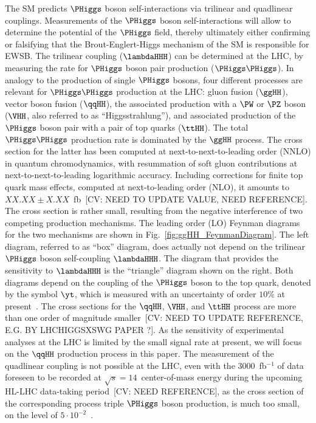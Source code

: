 The SM predicts $\PHiggs$ boson self-interactions via trilinear and quadlinear couplings. 
Measurements of the $\PHiggs$ boson self-interactions will allow to determine the potential of the $\PHiggs$ field,
thereby ultimately either confirming or falsifying that the Brout-Englert-Higgs mechanism of the SM is responsible for EWSB.
The trilinear coupling ($\lambdaHHH$) can be determined at the LHC, by measuring the rate for $\PHiggs$ boson pair production ($\PHiggs\PHiggs$). 
In analogy to the production of single $\PHiggs$ bosons, 
four different processes are relevant for $\PHiggs\PHiggs$ production at the LHC: 
gluon fusion ($\ggHH$), vector boson fusion ($\qqHH$), the associated production with a $\PW$ or $\PZ$ boson ($\VHH$, also referred to as ``Higgsstrahlung''),
and associated production of the $\PHiggs$ boson pair with a pair of top quarks ($\ttHH$).
The total $\PHiggs\PHiggs$ production rate is dominated by the $\ggHH$ process.
The cross section for the latter has been computed at next-to-next-to-leading order (NNLO) in quantum chromodynamics,
with resummation of soft gluon contributions at next-to-next-to-leading logarithmic accuracy.
Including corrections for finite top quark mass effects, computed at next-to-leading order (NLO),
it amounts to $XX.XX \pm X.XX$~fb~\cite{}[CV: NEED TO UPDATE VALUE, NEED REFERENCE].
The cross section is rather small, resulting from the negative interference of two competing production mechanisms.
The leading order (LO) Feynman diagrams for the two mechanisms are shown in Fig.~\ref{fig:ggHH_FeynmanDiagram}.
The left diagram, referred to as ``box'' diagram, does actually not depend on the trilinear $\PHiggs$ boson self-coupling $\lambdaHHH$.
The diagram that provides the sensitivity to $\lambdaHHH$ is the ``triangle'' diagram shown on the right.
Both diagrams depend on the coupling of the $\PHiggs$ boson to the top quark, denoted by the symbol $\yt$,
which is measured with an uncertainty of order $10\%$ at present~\cite{Aaboud:2018urx,HIG-17-035}.
The cross sections for the $\qqHH$, $\VHH$, and $\ttHH$ process are more than one order of magnitude smaller~\cite{Baglio:2012np}[CV: NEED TO UPDATE REFERENCE, E.G. BY LHCHIGGSXSWG PAPER ?].
As the sensitivity of experimental analyses at the LHC is limited by the small signal rate at present,
we will focus on the $\qqHH$ production process in this paper.
The measurement of the quadlinear coupling is not possible at the LHC, 
even with the $3000$~fb$^{-1}$ of data foreseen to be recorded at $\sqrt{s}=14$~\TeV center-of-mass energy during the upcoming HL-LHC data-taking period~\cite{}[CV: NEED REFERENCE],
as the cross section of the corresponding process triple $\PHiggs$ boson production, is much too small, 
on the level of $5 \cdot 10^{-2}$~\cite{Plehn:2005nk,Binoth:2006ym}.

